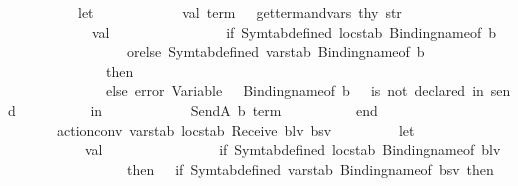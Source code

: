 \begin{isabellebody}
\ \ \ \ \ \ \ \ \ \ let\isanewline
\ \ \ \ \ \ \ \ \ \ \ \ val\ {\isacharparenleft}{\kern0pt}term{\isacharcomma}{\kern0pt}\ {\isacharunderscore}{\kern0pt}{\isacharparenright}{\kern0pt}\ {\isacharequal}{\kern0pt}\ get{\isacharunderscore}{\kern0pt}term{\isacharunderscore}{\kern0pt}and{\isacharunderscore}{\kern0pt}vars\ thy\ str\isanewline
\ \ \ \ \ \ \ \ \ \ \ \ val\ {\isacharunderscore}{\kern0pt}\ {\isacharequal}{\kern0pt}\isanewline
\ \ \ \ \ \ \ \ \ \ \ \ \ \ if\ Symtab{\isachardot}{\kern0pt}defined\ locstab\ {\isacharparenleft}{\kern0pt}Binding{\isachardot}{\kern0pt}name{\isacharunderscore}{\kern0pt}of\ b{\isacharparenright}{\kern0pt}\ \isanewline
\ \ \ \ \ \ \ \ \ \ \ \ \ \ \ \ \ orelse\ Symtab{\isachardot}{\kern0pt}defined\ varstab\ {\isacharparenleft}{\kern0pt}Binding{\isachardot}{\kern0pt}name{\isacharunderscore}{\kern0pt}of\ b{\isacharparenright}{\kern0pt}\isanewline
\ \ \ \ \ \ \ \ \ \ \ \ \ \ then\ {\isacharparenleft}{\kern0pt}{\isacharparenright}{\kern0pt}\isanewline
\ \ \ \ \ \ \ \ \ \ \ \ \ \ else\ error\ {\isacharparenleft}{\kern0pt}{\isachardoublequote}{\kern0pt}Variable\ {\isachardoublequote}{\kern0pt}\ {\isacharcircum}{\kern0pt}\ {\isacharparenleft}{\kern0pt}Binding{\isachardot}{\kern0pt}name{\isacharunderscore}{\kern0pt}of\ b{\isacharparenright}{\kern0pt}\ {\isacharcircum}{\kern0pt}\ {\isachardoublequote}{\kern0pt}\ is\ not\ declared\ {\isacharparenleft}{\kern0pt}in\ send{\isacharparenright}{\kern0pt}{\isachardoublequote}{\kern0pt}{\isacharparenright}{\kern0pt}\isanewline
\ \ \ \ \ \ \ \ \ \ in\isanewline
\ \ \ \ \ \ \ \ \ \ \ \ SendA\ {\isacharparenleft}{\kern0pt}b{\isacharcomma}{\kern0pt}\ term{\isacharparenright}{\kern0pt}\isanewline
\ \ \ \ \ \ \ \ \ \ end\isanewline
\isanewline
\ \ \ \ \ \ {\isacharbar}{\kern0pt}\ action{\isacharunderscore}{\kern0pt}conv\ varstab\ locstab\ {\isacharparenleft}{\kern0pt}Receive\ {\isacharparenleft}{\kern0pt}blv{\isacharcomma}{\kern0pt}\ bsv{\isacharparenright}{\kern0pt}{\isacharparenright}{\kern0pt}\ {\isacharequal}{\kern0pt}\isanewline
\ \ \ \ \ \ \ \ let\isanewline
\ \ \ \ \ \ \ \ \ \ \ val\ {\isacharunderscore}{\kern0pt}\ {\isacharequal}{\kern0pt}\isanewline
\ \ \ \ \ \ \ \ \ \ \ \ \ \ if\ Symtab{\isachardot}{\kern0pt}defined\ locstab\ {\isacharparenleft}{\kern0pt}Binding{\isachardot}{\kern0pt}name{\isacharunderscore}{\kern0pt}of\ blv{\isacharparenright}{\kern0pt}\isanewline
\ \ \ \ \ \ \ \ \ \ \ \ \ \ \ \ \ then\ \ \ if\ {\isacharparenleft}{\kern0pt}Symtab{\isachardot}{\kern0pt}defined\ varstab\ {\isacharparenleft}{\kern0pt}Binding{\isachardot}{\kern0pt}name{\isacharunderscore}{\kern0pt}of\ bsv{\isacharparenright}{\kern0pt}{\isacharparenright}{\kern0pt}\ then\ {\isacharparenleft}{\kern0pt}{\isacharparenright}{\kern0pt}\isanewline

\end{isabellebody}
